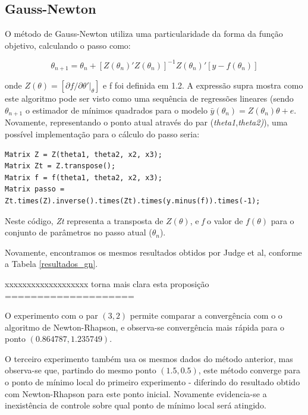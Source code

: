 \documentclass{abnt}
\newenvironment{mylisting}
{\begin{list}{}{\setlength{\leftmargin}{1em}}\item\scriptsize\bfseries}
{\end{list}}
\begin{document}
\subsection{Gauss-Newton}

	O método de Gauss-Newton utiliza uma particularidade da forma da função objetivo, calculando o passo como:

\[ \theta_{n+1} = \theta_{n} + [Z(\theta_n)'Z(\theta_n)]^{-1}Z(\theta_n)'[y-f(\theta_n)] \]

		onde $Z(\theta)=[\partial f/ \partial \theta'\vert_{\theta}]$ e f foi definida em 1.2. A expressão supra  mostra como este algoritmo pode ser visto como uma sequência de regressões lineares (sendo $\theta_{n+1}$ o estimador de mínimos quadrados para o modelo $\bar y(\theta_{n})=Z(\theta_{n})\theta + e$. Novamente, representando o ponto atual através do par (\textit{theta1},\textit{theta2)}), uma possível implementação para o cálculo do passo seria:

\begin{mylisting}
\begin{verbatim}
Matrix Z = Z(theta1, theta2, x2, x3); 
Matrix Zt = Z.transpose(); 
Matrix f = f(theta1, theta2, x2, x3); 
Matrix passo = Zt.times(Z).inverse().times(Zt).times(y.minus(f)).times(-1); 
\end{verbatim}
\end{mylisting}

Neste código, \textit{Zt} representa a transposta de $Z(\theta)$, e \textit{f} o valor de $f(\theta)$ para o conjunto de parâmetros no passo atual ($\theta_n$).

Novamente, encontramos os mesmos resultados obtidos por Judge et al, conforme a Tabela \ref{resultados_gn}. 


xxxxxxxxxxxxxxxxxxx  torna mais clara esta proposição ====================

	O experimento com o par $(3,2)$ permite comparar a convergência com o o algoritmo de Newton-Rhapson, e observa-se convergência mais rápida para o ponto $(0.864787, 1.235749)$.

O terceiro experimento também usa os mesmos dados do método anterior, mas observa-se que, partindo do mesmo ponto $(1.5, 0.5)$, este método converge para o ponto de mínimo local do primeiro experimento - diferindo do resultado obtido com Newton-Rhapson para este ponto inicial. Novamente evidencia-se a inexistência de controle sobre qual ponto de mínimo local será atingido.
\end{document}
